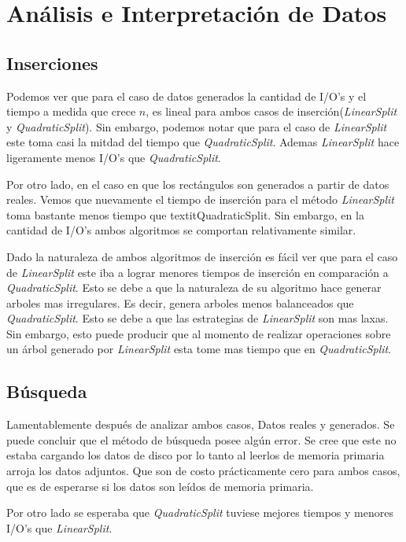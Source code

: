 \documentclass[letterpaper,12pt]{article}
\begin{document}
\section{An\'alisis e Interpretaci\'on de Datos}
 \subsection{Inserciones}
 
Podemos ver que para el caso de datos generados la cantidad de I/O's y el tiempo a medida que crece $n$, es lineal para ambos casos de inserción(\textit{LinearSplit} y \textit{QuadraticSplit}). Sin embargo, podemos notar que para el caso de \textit{LinearSplit} este toma casi la mitdad del tiempo que \textit{QuadraticSplit}. Ademas \textit{LinearSplit} hace ligeramente menos I/O's que \textit{QuadraticSplit}.

Por otro lado, en el caso en que los rectángulos son generados a partir de datos reales. Vemos que nuevamente el tiempo de inserción para el método \textit{LinearSplit} toma bastante menos tiempo que textit{QuadraticSplit}. Sin embargo, en la cantidad de I/O's ambos algoritmos se comportan relativamente similar.

Dado la naturaleza de ambos algoritmos de inserción es fácil ver que para el caso de \textit{LinearSplit} este iba a lograr menores tiempos de inserción en comparación a \textit{QuadraticSplit}. Esto se debe a que la naturaleza de su algoritmo hace generar arboles mas irregulares. Es decir, genera arboles menos balanceados que \textit{QuadraticSplit}. Esto se debe a que las estrategias de \textit{LinearSplit} son mas laxas. Sin embargo, esto puede producir que al momento de realizar operaciones sobre un árbol generado por \textit{LinearSplit} esta tome mas tiempo que en \textit{QuadraticSplit}.

 
\subsection{Búsqueda}
Lamentablemente después de analizar ambos casos, Datos reales y generados. Se puede concluir que el método de búsqueda posee algún error. Se cree que este no estaba cargando los datos de disco por lo tanto al leerlos de memoria primaria arroja los datos adjuntos. Que son de costo prácticamente cero para ambos casos, que es de esperarse si los datos son leídos de memoria primaria.  

Por otro lado se esperaba que \textit{QuadraticSplit} tuviese mejores tiempos y menores I/O's que \textit{LinearSplit}.
 
\end{document}
